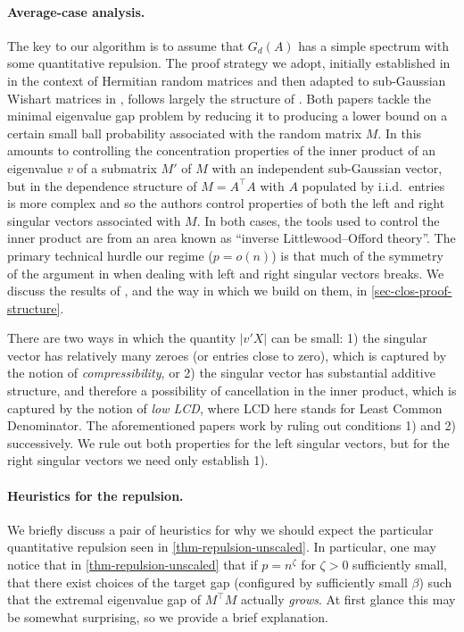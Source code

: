 \documentclass[11pt]{article}
\numberwithin{equation}{section}
\theoremstyle{remark}
\begin{document}
\paragraph{Average-case analysis.} The key to our algorithm is to assume that $G_{d}(A)$ has a simple spectrum with some quantitative repulsion. The proof strategy we adopt, initially established in \cite{nguyen2015randommatricestailbounds} in the context of Hermitian random matrices and then adapted to sub-Gaussian Wishart matrices in \cite{christoffersen2025gaps}, follows largely the structure of \cite{christoffersen2025gaps}. Both papers tackle the minimal eigenvalue gap problem by reducing it to producing a lower bound on a certain small ball probability associated with the random matrix $M$. In \cite{nguyen2015randommatricestailbounds} this amounts to controlling the concentration properties of the inner product of an eigenvalue $v$ of a submatrix $M'$ of $M$ with an independent sub-Gaussian vector, but in \cite{christoffersen2025gaps} the dependence structure of $M = A^\top A$ with $A$ populated by i.i.d.\ entries is more complex and so the authors control properties of both the left and right singular vectors associated with $M$. In both cases, the tools used to control the inner product are from an area known as ``inverse Littlewood--Offord theory''. The primary technical hurdle our regime ($p = o(n)$) is that much of the symmetry of the argument in \cite{christoffersen2025gaps} when dealing with left and right singular vectors breaks. We discuss the results of \cite{christoffersen2025gaps}, and the way in which we build on them, in \cref{sec-clos-proof-structure}.

There are two ways in which the quantity $|v'X|$ can be small: 1) the singular vector has relatively many zeroes (or entries close to zero), which is captured by the notion of \textit{compressibility}, or 2) the singular vector has substantial additive structure, and therefore a possibility of cancellation in the inner product, which is captured by the notion of \textit{low LCD}, where LCD here stands for Least Common Denominator. The aforementioned papers work by ruling out conditions 1) and 2) successively. We rule out both properties for the left singular vectors, but for the right singular vectors we need only establish 1).

\paragraph{Heuristics for the repulsion.}
We briefly discuss a pair of heuristics for why we should expect the particular quantitative repulsion seen in \cref{thm-repulsion-unscaled}.
In particular, one may notice that in \cref{thm-repulsion-unscaled} that if $p = n^{\zeta}$ for $\zeta > 0$ sufficiently small, that there exist choices of the target gap (configured by sufficiently small $\beta$) such that the extremal eigenvalue gap of $M^\top M$ actually \textit{grows}. At first glance this may be somewhat surprising, so we provide a brief explanation.
\end{document}
